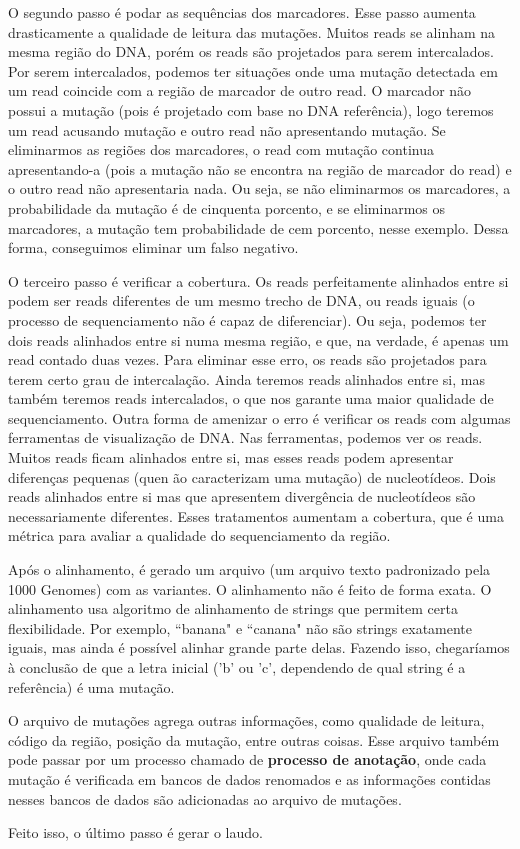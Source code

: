 O segundo passo é podar as sequências dos marcadores. Esse passo aumenta drasticamente a qualidade de leitura das mutações. Muitos reads se alinham na mesma
região do DNA, porém os reads são projetados para serem intercalados. Por serem intercalados, podemos ter situações onde uma mutação detectada em um read
coincide com a região de marcador de outro read. O marcador não possui a mutação (pois é projetado com base no DNA referência), logo teremos um read acusando
mutação e outro read não apresentando mutação. Se eliminarmos as regiões dos marcadores, o read com mutação continua apresentando-a (pois a mutação não se
encontra na região de marcador do read) e o outro read não apresentaria nada. Ou seja, se não eliminarmos os marcadores, a probabilidade da mutação é de
cinquenta porcento, e se eliminarmos os marcadores, a mutação tem probabilidade de cem porcento, nesse exemplo. Dessa forma, conseguimos eliminar um falso
negativo.

O terceiro passo é verificar a cobertura. Os reads perfeitamente alinhados entre si podem ser reads diferentes de um mesmo trecho de DNA, ou reads iguais
(o processo de sequenciamento não é capaz de diferenciar). Ou seja, podemos ter dois reads alinhados entre si numa mesma região, e que, na verdade, é apenas
um read contado duas vezes. Para eliminar esse erro, os reads são projetados para terem certo grau de intercalação. Ainda teremos reads alinhados entre si,
mas também teremos reads intercalados, o que nos garante uma maior qualidade de sequenciamento. Outra forma de amenizar o erro é verificar os reads com
algumas ferramentas de visualização de DNA. Nas ferramentas, podemos ver os reads. Muitos reads ficam alinhados entre si, mas esses reads podem apresentar
diferenças pequenas (quen ão caracterizam uma mutação) de nucleotídeos. 
Dois reads alinhados entre si mas que apresentem divergência de nucleotídeos são necessariamente diferentes. Esses tratamentos aumentam a cobertura,
que é uma métrica para avaliar a qualidade do sequenciamento da região.

Após o alinhamento, é gerado um arquivo (um arquivo texto padronizado pela 1000 Genomes) com as variantes. O alinhamento não é feito de forma exata. 
O alinhamento usa algoritmo de alinhamento de strings que permitem certa flexibilidade. Por exemplo, ``banana" e ``canana" não são strings exatamente 
iguais, mas ainda é possível alinhar grande parte delas. Fazendo isso, chegaríamos à conclusão de que a letra inicial ('b' ou 'c', dependendo de qual 
string é a referência) é uma mutação.

O arquivo de mutações agrega outras informações, como qualidade de leitura, código da região, posição da mutação, entre outras coisas. Esse arquivo também
pode passar por um processo chamado de \textbf{processo de anotação}, onde cada mutação é verificada em bancos de dados renomados e as informações
contidas nesses bancos de dados são adicionadas ao arquivo de mutações.

Feito isso, o último passo é gerar o laudo.
